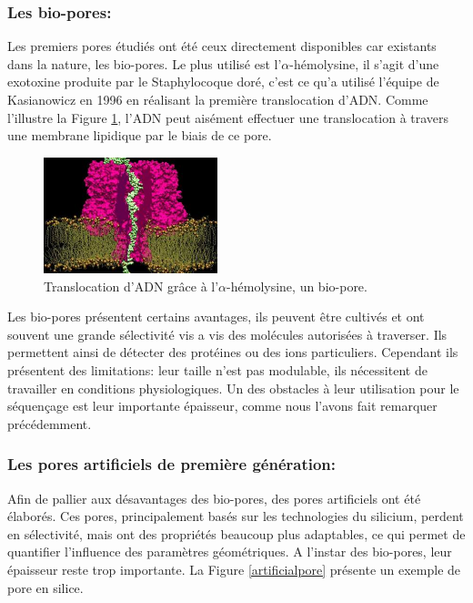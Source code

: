 \documentclass[a4paper,11pt]{article}
\begin{document}
\subsubsection*{Les bio-pores:}
Les premiers pores étudiés ont été ceux directement disponibles car existants dans la nature, les bio-pores. Le plus utilisé est l'$\alpha$-hémolysine, il s'agit d'une exotoxine produite par le Staphylocoque doré, c'est ce qu'a utilisé l'équipe de Kasianowicz \cite{kasianowicz} en 1996 en réalisant la première translocation d'ADN. Comme l'illustre la Figure \ref{biopore}, l'ADN peut aisément effectuer une translocation à travers une membrane lipidique par le biais de ce pore. \\

\begin{figure}[H]
\begin{center}
\includegraphics[width=0.45\textwidth]{biopore.jpg}

\caption{Translocation d'ADN grâce à l'$\alpha$-hémolysine, un bio-pore.}
\label{biopore}
\end{center}
\end{figure}

Les bio-pores présentent certains avantages, ils peuvent être cultivés et ont souvent une grande sélectivité vis a vis des molécules autorisées à traverser. Ils permettent ainsi de détecter des protéines ou des ions particuliers. Cependant ils présentent des limitations: leur taille n'est pas modulable, ils nécessitent de travailler en conditions physiologiques. Un des obstacles à leur utilisation pour le séquençage est leur importante épaisseur, comme nous l'avons fait remarquer précédemment.


\subsubsection*{Les pores artificiels de première génération:}

Afin de pallier aux désavantages des bio-pores, des pores artificiels ont été élaborés. Ces pores, principalement basés sur les technologies du silicium, perdent en sélectivité, mais ont des propriétés beaucoup plus adaptables, ce qui permet de quantifier l'influence des paramètres géométriques. A l'instar des bio-pores, leur épaisseur reste trop importante. La Figure \ref{artificialpore} présente un exemple de pore en silice.
\end{document}
